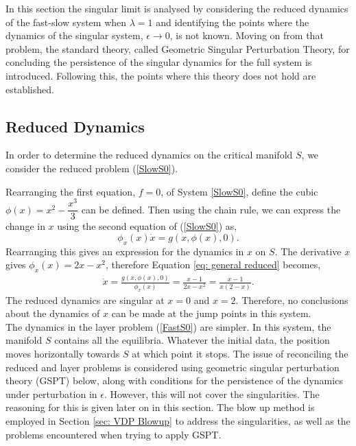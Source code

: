 In this section the singular limit is analysed by considering the reduced dynamics of the fast-slow system when $\lambda=1$ and identifying the points where the dynamics of the singular system, $\epsilon \to 0$, is not known. Moving on from that problem, the standard theory, called Geometric Singular Perturbation Theory, for concluding the persistence of the singular dynamics for the full system is introduced. Following this, the points where this theory does not hold are established.

\subsection{Reduced Dynamics}
In order to determine the reduced dynamics on the critical manifold $S$, we consider the reduced problem (\ref{SlowS0}). 

Rearranging the first equation, $f=0$, of System \ref{SlowS0}, define the cubic $ \phi(x) = x^2-\dfrac{x^3}{3}$ can be defined. Then using the chain rule, we can express the change in $x$ using the second equation of (\ref{SlowS0}) as,
\begin{equation}
\phi_x(x)\dot{x}=g(x,\phi(x),0).
\label{eq: general reduced}
\end{equation}
Rearranging this gives an expression for the dynamics in $x$ on $S$.
The derivative \wrt $x$ gives $\phi_x(x)=2x-x^2$, therefore Equation \ref{eq: general reduced} becomes, 
\begin{align*}
\dot{x} = \frac{g(x,\phi(x),0)}{ \phi_x(x)} = \frac{ x-1}{2x-x^2} =\frac{ x-1}{x(2-x)}.
\end{align*}
The reduced dynamics are singular at $x=0$ and $x=2$. Therefore, no conclusions about the dynamics of $x$ can be made at the jump points in this system. \\ 

The dynamics in the layer problem (\ref{FastS0}) are simpler. In this system, the manifold $S$ contains all the equilibria. Whatever the initial data, the position moves horizontally towards $S$ at which point it stops. The issue of reconciling the reduced and layer problems is considered using geometric singular perturbation theory (GSPT) below, along with conditions for the persistence of the dynamics under perturbation in $\epsilon$. However, this will not cover the singularities. The reasoning for this is given later on in this section. The blow up method is employed in Section \ref{sec: VDP Blowup} to address the singularities, as well as the problems encountered when trying to apply GSPT. 

